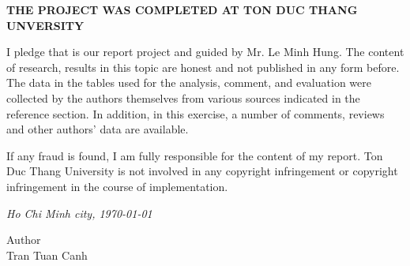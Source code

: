 \newpage	
\vspace{5cm} 
		
\begin{center}
{
\fontsize{16pt}{1}\selectfont
\textbf{THE PROJECT WAS COMPLETED AT TON DUC THANG UNVERSITY}
}
\end{center} 		
	\noindent
	
I pledge that is our report project and guided by Mr. Le Minh Hung. The content of research, results in this topic are honest and not published in any form before. The data in the tables used for the analysis, comment, and evaluation were collected by the authors themselves from various sources indicated in the reference section. In addition, in this exercise, a number of comments, reviews and other authors' data are available.

If any fraud is found, I am fully responsible for the content of my report. Ton Duc Thang University is not involved in any copyright infringement or copyright infringement in the course of implementation.





\begin{flushright}
{\it Ho Chi Minh city, \today{} }

Author \hskip 2cm\quad
 ~\\[1.5cm] 
Tran Tuan Canh\hskip 1.5cm\quad


\end{flushright}
\newpage